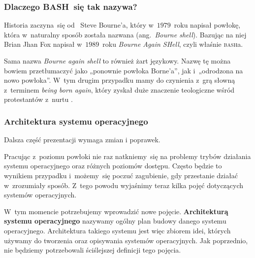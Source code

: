 \documentclass[10pt,t]{beamer}
\begin{document}
\begin{frame}
  \frametitle{Dlaczego BASH~się tak nazywa?}


  Historia zaczyna~się
  od~
  {Steve Bourne’a}, który w~$1979$~roku napisał powłokę, która w~naturalny
  sposób została nazwana
  (ang.~\textit{Bourne shell}). Bazując na niej
  {Brian Jhan Fox} napisał w~$1989$~roku \textit{Bourne Again SHell},
  czyli właśnie
  {\textsc{bash}a}.

  Sama nazwa \textit{Bourne again shell} to również żart językowy. Nazwę tę
  można bowiem przetłumaczyć jako „ponownie powłoka Borne’a”, jak
  i~„odrodzona na nowo powłoka”. W~tym drugim przypadku mamy do czynienia
  z~grą słowną z~terminem
  {\textit{being born again}}, który zyskał
  duże znaczenie teologiczne wśród protestantów z~nurtu
  .

\end{frame}






\begin{frame}
  \frametitle{Architektura systemu operacyjnego}


  \alert{Dalsza część prezentacji wymaga zmian i poprawek.}

  Pracując z~poziomu powłoki nie raz natkniemy~się na problemy
  trybów działania systemu operacyjnego oraz różnych poziomów dostępu.
  Często będzie to wynikiem przypadku i~możemy~się poczuć zagubienie,
  gdy przestanie działać w~zrozumiały sposób. Z~tego powodu wyjaśnimy teraz
  kilka pojęć dotyczących systemów operacyjnych.

  W~tym momencie potrzebujemy wprowadzić nowe pojęcie.
  \textbf{Architekturą systemu operacyjnego} nazywamy ogólny plan budowy
  danego systemu operacyjnego. Architektura takiego systemu jest więc
  zbiorem idei, których używamy do tworzenia oraz opisywania systemów
  operacyjnych. Jak poprzednio, nie będziemy potrzebowali ściślejszej
  definicji tego pojęcia.

\end{frame}
\end{document}
